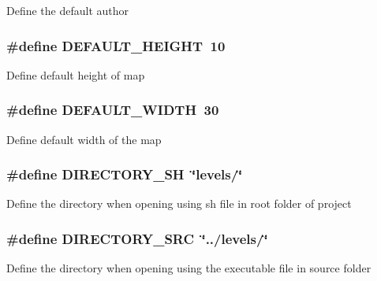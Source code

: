 Define the default author \hypertarget{pacman-level-editor_8c_a1879f9e5604a01f0983829846001ab23}{
\subsubsection[{D\-E\-F\-A\-U\-L\-T\-\_\-\-H\-E\-I\-G\-H\-T}]{\setlength{\rightskip}{0pt plus 5cm}\#define D\-E\-F\-A\-U\-L\-T\-\_\-\-H\-E\-I\-G\-H\-T~10}}\label{pacman-level-editor_8c_a1879f9e5604a01f0983829846001ab23}
Define default height of map \hypertarget{pacman-level-editor_8c_a93493eb8fae5549bd5be67f3449245e0}{
\subsubsection[{D\-E\-F\-A\-U\-L\-T\-\_\-\-W\-I\-D\-T\-H}]{\setlength{\rightskip}{0pt plus 5cm}\#define D\-E\-F\-A\-U\-L\-T\-\_\-\-W\-I\-D\-T\-H~30}}\label{pacman-level-editor_8c_a93493eb8fae5549bd5be67f3449245e0}
Define default width of the map \hypertarget{pacman-level-editor_8c_a7a602a4376595097bdde82a739d7fc9c}{
\subsubsection[{D\-I\-R\-E\-C\-T\-O\-R\-Y\-\_\-\-S\-H}]{\setlength{\rightskip}{0pt plus 5cm}\#define D\-I\-R\-E\-C\-T\-O\-R\-Y\-\_\-\-S\-H~\char`\"{}levels/\char`\"{}}}\label{pacman-level-editor_8c_a7a602a4376595097bdde82a739d7fc9c}
Define the directory when opening using sh file in root folder of project \hypertarget{pacman-level-editor_8c_a680ab63d028a68a793615c14b807244e}{
\subsubsection[{D\-I\-R\-E\-C\-T\-O\-R\-Y\-\_\-\-S\-R\-C}]{\setlength{\rightskip}{0pt plus 5cm}\#define D\-I\-R\-E\-C\-T\-O\-R\-Y\-\_\-\-S\-R\-C~\char`\"{}../levels/\char`\"{}}}\label{pacman-level-editor_8c_a680ab63d028a68a793615c14b807244e}
Define the directory when opening using the executable file in source folder 

